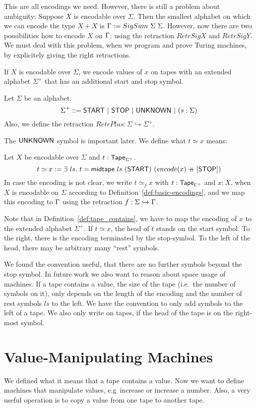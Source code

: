 This are all encodings we need.  However, there is still a problem about ambiguity: Suppose $X$ is encodable over $\Sigma$.  Then the smallest
alphabet on which we can encode the type $X+X$ is $\Gamma := SigSum~\Sigma~\Sigma$.  However, now there are two possibilities how to encode $X$ on
$\Gamma$: using the retraction $RetrSigX$ and $RetrSigY$.  We must deal with this problem, when we program and prove Turing machines, by explicitely
giving the right retractions.

If $X$ is encodable over $\Sigma$, we encode values of $x$ on tapes with an extended alphabet $\Sigma^+$ that has an additional start and stop symbol.
\begin{definition}[$\Sigma^+$] Let $\Sigma$ be an alphabet.
  \[
    \Sigma^+ ::= \textsf{START} ~|~ \textsf{STOP} ~|~ \textsf{UNKNOWN} ~|~ (s: \Sigma)
  \]
  Also, we define the retraction $RetrPlus : \Sigma \hookrightarrow \Sigma^+$.
\end{definition}
The $\textsf{UNKNOWN}$ symbol is important later. We define what $t \simeq x$ means:
\begin{definition}[$t \simeq x$]
  \label{def:tape_contains}
  Let $X$ be encodable over $\Sigma$ and $t : \textsf{Tape}_{\Sigma^+}$.
  \[
    t \simeq x := \exists~ls.~
    t = \textsf{midtape}~ls~(\textsf{START})~(encode(x) \mathbin{+\mkern-10mu+} [\textsf{STOP}])
  \]
  In case the encoding is not clear, we write $t \simeq_{f} x$ with $t:\textsf{Tape}_{\Gamma^+}$ and $x:X$, when $X$ is encodable on $\Sigma$ according to
  Definition~\ref{def:basic-encodings}, and we map this encoding to $\Gamma$ using the retraction $f: \Sigma \hookrightarrow \Gamma$.
\end{definition}

Note that in Definition~\ref{def:tape_contains}, we have to map the encoding of $x$ to the extended alphabet $\Sigma^+$.  If $t \simeq x$, the head of
$t$ stands on the start symbol.  To the right, there is the encoding terminated by the stop-symbol.  To the left of the head, there may be arbitrary
many ``rest'' symbols.

We found the convention useful, that there are no further symbols beyond the stop symbol.  In future work we also want to reason about space usage of
machines.  If a tape contains a value, the size of the tape (i.e.\ the number of symbols on it), only depends on the length of the encoding and the
number of rest symbols $ls$ to the left.  We have the convention to only add symbols to the left of a tape.  We also only write on tapes, if the head
of the tape is on the right-most symbol.

\section{Value-Manipulating Machines}
\label{sec:value-manipulate}


We defined what it means that a tape contains a value.  Now we want to define machines that manipulate values, e.g\ increase or increase a number.
Also, a very useful operation is to copy a value from one tape to another tape.


\todo{}







